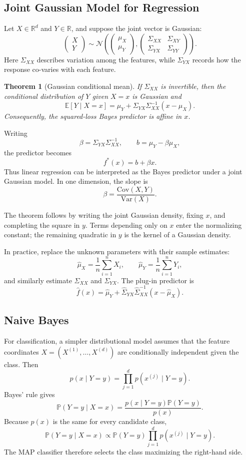 \documentclass[12pt,oneside]{book}
\numberwithin{equation}{section}
\theoremstyle{definition}
\theoremstyle{plain}
\newtheorem{theorem}{Theorem}[section]
\theoremstyle{remark}
\newcommand{\R}{\mathbb{R}}
\newcommand{\E}{\mathbb{E}}
\newcommand{\Var}{\mathrm{Var}}
\newcommand{\Cov}{\mathrm{Cov}}
\begin{document}
\subsection{Joint Gaussian Model for Regression}
Let $X\in\R^d$ and $Y\in\R$, and suppose the joint vector is Gaussian:
\[
\begin{pmatrix}X\\Y\end{pmatrix}
\sim\mathcal{N}\left(
\begin{pmatrix}\mu_X\\\mu_Y\end{pmatrix},
\begin{pmatrix}
\Sigma_{XX} & \Sigma_{XY}\\
\Sigma_{YX} & \Sigma_{YY}
\end{pmatrix}
\right).
\]
Here $\Sigma_{XX}$ describes variation among the features, while
$\Sigma_{YX}$ records how the response co-varies with each feature.

\begin{theorem}[Gaussian conditional mean]
If $\Sigma_{XX}$ is invertible, then the conditional distribution of $Y$ given
$X=x$ is Gaussian and
\[
\E[Y\mid X=x]
=\mu_Y+\Sigma_{YX}\Sigma_{XX}^{-1}(x-\mu_X).
\]
Consequently, the squared-loss Bayes predictor is affine in $x$.
\end{theorem}

Writing
\[
\beta=\Sigma_{YX}\Sigma_{XX}^{-1},
\qquad
b=\mu_Y-\beta\mu_X,
\]
the predictor becomes
\[
f^*(x)=b+\beta x.
\]
Thus linear regression can be interpreted as the Bayes predictor under a joint
Gaussian model. In one dimension, the slope is
\[
\beta=\frac{\Cov(X,Y)}{\Var(X)}.
\]

The theorem follows by writing the joint Gaussian density, fixing $x$, and
completing the square in $y$. Terms depending only on $x$ enter the normalizing
constant; the remaining quadratic in $y$ is the kernel of a Gaussian density.

In practice, replace the unknown parameters with their sample estimates:
\[
\widehat\mu_X=\frac1n\sum_{i=1}^nX_i,
\qquad
\widehat\mu_Y=\frac1n\sum_{i=1}^nY_i,
\]
and similarly estimate $\Sigma_{XX}$ and $\Sigma_{YX}$. The plug-in predictor is
\[
\widehat f(x)=\widehat\mu_Y+
\widehat\Sigma_{YX}\widehat\Sigma_{XX}^{-1}
(x-\widehat\mu_X).
\]

\subsection{Naive Bayes}
For classification, a simpler distributional model assumes that the feature
coordinates $X=(X^{(1)},\ldots,X^{(d)})$ are conditionally independent given
the class. Then
\[
p(x\mid Y=y)=\prod_{j=1}^d p(x^{(j)}\mid Y=y).
\]
Bayes' rule gives
\[
\mathbb{P}(Y=y\mid X=x)
=\frac{p(x\mid Y=y)\mathbb{P}(Y=y)}{p(x)}.
\]
Because $p(x)$ is the same for every candidate class,
\[
\mathbb{P}(Y=y\mid X=x)
\propto
\mathbb{P}(Y=y)\prod_{j=1}^d p(x^{(j)}\mid Y=y).
\]
The MAP classifier therefore selects the class maximizing the right-hand side.
\end{document}

